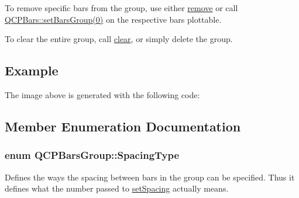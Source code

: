 To remove specific bars from the group, use either \hyperlink{classQCPBarsGroup_a215e28a5944f1159013a0e19169220e7}{remove} or call \hyperlink{classQCPBars_aedd1709061f0b307c47ddb45e172ef9a}{Q\+C\+P\+Bars\+:\+:set\+Bars\+Group(0)} on the respective bars plottable.

To clear the entire group, call \hyperlink{classQCPBarsGroup_a3ddf23928c6cd89530bd34ab7ba7b177}{clear}, or simply delete the group.\hypertarget{classQCPBarsGroup_qcpbarsgroup-example}{}\subsection{Example}\label{classQCPBarsGroup_qcpbarsgroup-example}
The image above is generated with the following code\+: 
\begin{DoxyCodeInclude}
\end{DoxyCodeInclude}


\subsection{Member Enumeration Documentation}
\hypertarget{classQCPBarsGroup_a4c0521120a97e60bbca37677a37075b6}{}
\subsubsection[{Spacing\+Type}]{\setlength{\rightskip}{0pt plus 5cm}enum {\bf Q\+C\+P\+Bars\+Group\+::\+Spacing\+Type}}\label{classQCPBarsGroup_a4c0521120a97e60bbca37677a37075b6}
Defines the ways the spacing between bars in the group can be specified. Thus it defines what the number passed to \hyperlink{classQCPBarsGroup_aa553d327479d72a0c3dafcc724a190e2}{set\+Spacing} actually means.

